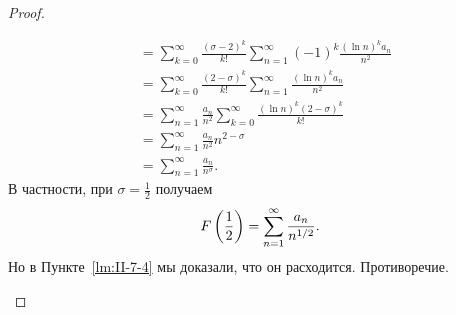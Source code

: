 \begin{proof}
\begin{casesp}
\begin{align*}
                &= \sum_{k=0}^{\infty} \frac{(\sigma - 2)^k}{k!}\sum_{n=1}^{\infty} (-1)^k\frac{(\ln{n})^k a_n}{n^2} \\
                &= \sum_{k=0}^{\infty} \frac{(2 - \sigma)^k}{k!} \sum_{n=1}^{\infty} \frac{(\ln{n})^k a_n}{n^2} \\
                &= \sum_{n=1}^{\infty} \frac{a_n}{n^2} \sum_{k=0}^{\infty} \frac{(\ln{n})^k (2 - \sigma)^k}{k!} \\
                &= \sum_{n=1}^{\infty} \frac{a_n}{n^2}n^{2-\sigma} \\
                &= \sum_{n=1}^{\infty} \frac{a_n}{n^\sigma}.
            \end{align*}
            В частности, при $\sigma = \frac{1}{2}$ получаем
            \[
                F\left( \frac{1}{2} \right) = \sum_{n=1}^{\infty} \frac{a_n}{n^{1 / 2}}.
            \]
            Но в Пункте~\ref{lm:II-7-4} мы доказали, что он расходится. Противоречие.
    \end{casesp}
\end{proof}
